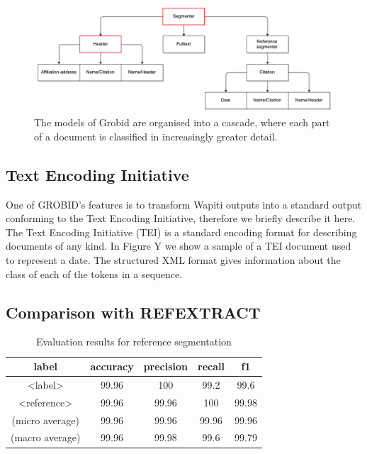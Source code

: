 \begin{figure}[!ht]
\center
\includegraphics[width=\textwidth]{Figures/cascade.pdf}
\caption{The models of Grobid are organised into a cascade, where each part of a document is classified in increasingly greater detail.}
\label{fig:cascade}
\end{figure}

\subsection{Text Encoding Initiative}

One of GROBID's features is to transform Wapiti outputs into a standard output conforming to the Text Encoding Initiative, therefore we briefly describe it here. The Text Encoding Initiative (TEI) is a standard encoding format for describing documents of any kind. In Figure Y we show a sample of a TEI document used to represent a date. The structured XML format gives information about the class of each of the tokens in a sequence.

\subsection{Comparison with REFEXTRACT}
\label{subsec:refextract}
\begin{table}[h]
\begin{center}
\begin{tabular}{|c|cccc|}
\hline
label		&accuracy	&precision	&recall		&f1 \\
\hline
<label>		&99.96		&100		&99.2		&99.6\\
<reference>		&99.96		&99.96		&100		&99.98\\
\hline
(micro average) & 99.96		&99.96		&99.96		&99.96	\\
(macro average) &	99.96 & 99.98	& 99.6 & 99.79	\\
\hline
\end{tabular}
\caption[Table caption text]{Evaluation results for reference segmentation}
\end{center}
\end{table}

